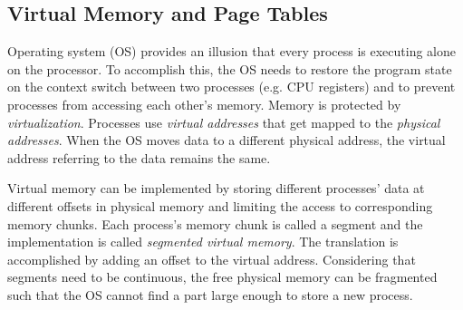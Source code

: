 \subsection{Virtual Memory and Page Tables} \label{subsec:vm}

Operating system (OS) provides an illusion that every process is executing alone
on the processor. To accomplish this, the OS needs to restore the program state
on the context switch between two processes (e.g. CPU registers) and to prevent 
processes from accessing each other's memory. Memory is protected by
\emph{virtualization}. Processes use \emph{virtual addresses} that get mapped to
the \emph{physical addresses}. When the OS moves data to a different physical 
address, the virtual address referring to the data remains the same.

Virtual memory can be implemented by storing different processes' data at 
different offsets in physical memory and limiting the access to corresponding 
memory chunks. Each process's memory chunk is called a segment and the 
implementation is called \emph{segmented virtual memory}. The translation is 
accomplished by adding an offset to the virtual address. Considering that 
segments need to be continuous, the free physical memory can be fragmented
such that the OS cannot find a part large enough to store a new process.

